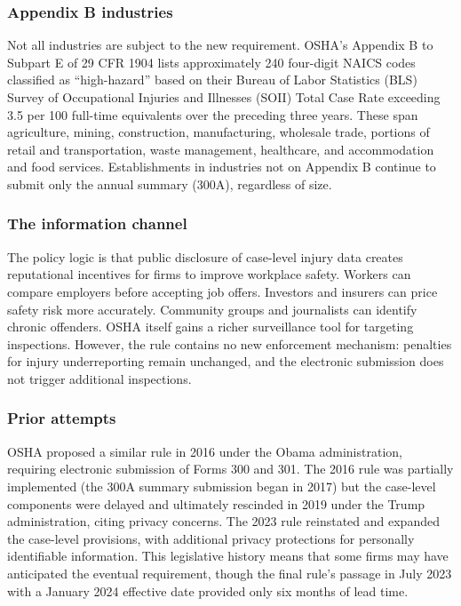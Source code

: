 \documentclass[12pt]{article}
\begin{document}
\subsubsection*{Appendix B industries} Not all industries are subject to the new requirement. OSHA's Appendix B to Subpart E of 29 CFR 1904 lists approximately 240 four-digit NAICS codes classified as ``high-hazard'' based on their Bureau of Labor Statistics (BLS) Survey of Occupational Injuries and Illnesses (SOII) Total Case Rate exceeding 3.5 per 100 full-time equivalents over the preceding three years. These span agriculture, mining, construction, manufacturing, wholesale trade, portions of retail and transportation, waste management, healthcare, and accommodation and food services. Establishments in industries not on Appendix B continue to submit only the annual summary (300A), regardless of size.

\subsubsection*{The information channel} The policy logic is that public disclosure of case-level injury data creates reputational incentives for firms to improve workplace safety. Workers can compare employers before accepting job offers. Investors and insurers can price safety risk more accurately. Community groups and journalists can identify chronic offenders. OSHA itself gains a richer surveillance tool for targeting inspections. However, the rule contains no new enforcement mechanism: penalties for injury underreporting remain unchanged, and the electronic submission does not trigger additional inspections.

\subsubsection*{Prior attempts} OSHA proposed a similar rule in 2016 under the Obama administration, requiring electronic submission of Forms 300 and 301. The 2016 rule was partially implemented (the 300A summary submission began in 2017) but the case-level components were delayed and ultimately rescinded in 2019 under the Trump administration, citing privacy concerns. The 2023 rule reinstated and expanded the case-level provisions, with additional privacy protections for personally identifiable information. This legislative history means that some firms may have anticipated the eventual requirement, though the final rule's passage in July 2023 with a January 2024 effective date provided only six months of lead time.
\end{document}
